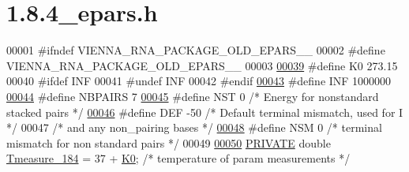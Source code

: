 \hypertarget{1_88_84__epars_8h_source}{}\section{1.8.4\+\_\+epars.h}
\label{1_88_84__epars_8h_source}

\begin{DoxyCode}
00001 \textcolor{preprocessor}{#ifndef VIENNA\_RNA\_PACKAGE\_OLD\_EPARS\_\_}
00002 \textcolor{preprocessor}{#define VIENNA\_RNA\_PACKAGE\_OLD\_EPARS\_\_}
00003 
\mbox{\hyperlink{1_88_84__epars_8h_a307c72605e3713972b4f4fb2d53ea20e}{00039}} \textcolor{preprocessor}{#define K0        273.15}
00040 \textcolor{preprocessor}{#ifdef INF}
00041 \textcolor{preprocessor}{#undef INF}
00042 \textcolor{preprocessor}{#endif}
\mbox{\hyperlink{1_88_84__epars_8h_a12c2040f25d8e3a7b9e1c2024c618cb6}{00043}} \textcolor{preprocessor}{#define INF       1000000}
\mbox{\hyperlink{1_88_84__epars_8h_a5e75221c779d618eab81e096f37e32ce}{00044}} \textcolor{preprocessor}{#define NBPAIRS   7}
\mbox{\hyperlink{1_88_84__epars_8h_aba99514484a1d6388a800285ffa8677a}{00045}} \textcolor{preprocessor}{#define NST       0     }\textcolor{comment}{/* Energy for nonstandard stacked pairs */}\textcolor{preprocessor}{}
\mbox{\hyperlink{1_88_84__epars_8h_a397419fc12b37ed479c8abb9d444d843}{00046}} \textcolor{preprocessor}{#define DEF       -50   }\textcolor{comment}{/* Default terminal mismatch, used for I */}\textcolor{preprocessor}{}
00047                         \textcolor{comment}{/* and any non\_pairing bases */}
\mbox{\hyperlink{1_88_84__epars_8h_a5e79d53b15366c1b3a441272ab27d8ec}{00048}} \textcolor{preprocessor}{#define NSM       0     }\textcolor{comment}{/* terminal mismatch for non standard pairs */}\textcolor{preprocessor}{}
00049 
\mbox{\hyperlink{1_88_84__epars_8h_a0b62381b924e10aeb1e48aac55bd5f52}{00050}} \mbox{\hyperlink{edit__cost_8h_a5e151c615eda34903514212f05a5ccf8}{PRIVATE}} \textcolor{keywordtype}{double} \mbox{\hyperlink{1_88_84__epars_8h_a0b62381b924e10aeb1e48aac55bd5f52}{Tmeasure\_184}} = 37 + \mbox{\hyperlink{1_88_84__epars_8h_a307c72605e3713972b4f4fb2d53ea20e}{K0}};  \textcolor{comment}{/* temperature of param measurements */}

\end{DoxyCode}
